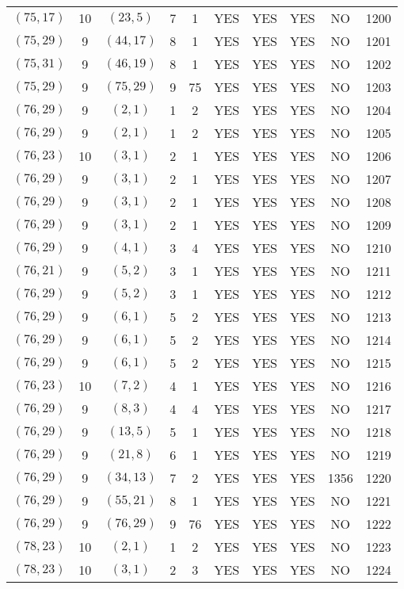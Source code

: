 \begin{longtable}{|c|c|c|c|c|c|c|c|c|c|}
$(75, 17)$ & 10 & $(23, 5)$ & 7 & 1 & YES & YES & YES & NO & 1200\\
$(75, 29)$ & 9 & $(44, 17)$ & 8 & 1 & YES & YES & YES & NO & 1201\\
$(75, 31)$ & 9 & $(46, 19)$ & 8 & 1 & YES & YES & YES & NO & 1202\\
$(75, 29)$ & 9 & $(75, 29)$ & 9 & 75 & YES & YES & YES & NO & 1203\\
$(76, 29)$ & 9 & $(2, 1)$ & 1 & 2 & YES & YES & YES & NO & 1204\\
$(76, 29)$ & 9 & $(2, 1)$ & 1 & 2 & YES & YES & YES & NO & 1205\\
$(76, 23)$ & 10 & $(3, 1)$ & 2 & 1 & YES & YES & YES & NO & 1206\\
$(76, 29)$ & 9 & $(3, 1)$ & 2 & 1 & YES & YES & YES & NO & 1207\\
$(76, 29)$ & 9 & $(3, 1)$ & 2 & 1 & YES & YES & YES & NO & 1208\\
$(76, 29)$ & 9 & $(3, 1)$ & 2 & 1 & YES & YES & YES & NO & 1209\\
$(76, 29)$ & 9 & $(4, 1)$ & 3 & 4 & YES & YES & YES & NO & 1210\\
$(76, 21)$ & 9 & $(5, 2)$ & 3 & 1 & YES & YES & YES & NO & 1211\\
$(76, 29)$ & 9 & $(5, 2)$ & 3 & 1 & YES & YES & YES & NO & 1212\\
$(76, 29)$ & 9 & $(6, 1)$ & 5 & 2 & YES & YES & YES & NO & 1213\\
$(76, 29)$ & 9 & $(6, 1)$ & 5 & 2 & YES & YES & YES & NO & 1214\\
$(76, 29)$ & 9 & $(6, 1)$ & 5 & 2 & YES & YES & YES & NO & 1215\\
$(76, 23)$ & 10 & $(7, 2)$ & 4 & 1 & YES & YES & YES & NO & 1216\\
$(76, 29)$ & 9 & $(8, 3)$ & 4 & 4 & YES & YES & YES & NO & 1217\\
$(76, 29)$ & 9 & $(13, 5)$ & 5 & 1 & YES & YES & YES & NO & 1218\\
$(76, 29)$ & 9 & $(21, 8)$ & 6 & 1 & YES & YES & YES & NO & 1219\\
$(76, 29)$ & 9 & $(34, 13)$ & 7 & 2 & YES & YES & YES & 1356 & 1220\\
$(76, 29)$ & 9 & $(55, 21)$ & 8 & 1 & YES & YES & YES & NO & 1221\\
$(76, 29)$ & 9 & $(76, 29)$ & 9 & 76 & YES & YES & YES & NO & 1222\\
$(78, 23)$ & 10 & $(2, 1)$ & 1 & 2 & YES & YES & YES & NO & 1223\\
$(78, 23)$ & 10 & $(3, 1)$ & 2 & 3 & YES & YES & YES & NO & 1224\\

\end{longtable}
